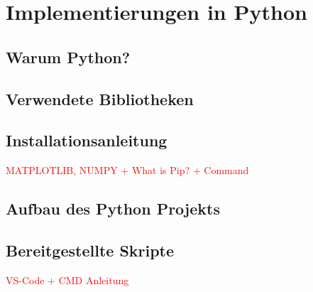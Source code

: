 \chapter{Implementierungen in Python}

\section{Warum Python?}

\section{Verwendete Bibliotheken}

\section{Installationsanleitung}
\textcolor{red}{MATPLOTLIB, NUMPY + What is Pip? + Command}

\section{Aufbau des Python Projekts}






\section{Bereitgestellte Skripte}
\textcolor{red}{VS-Code + CMD Anleitung}